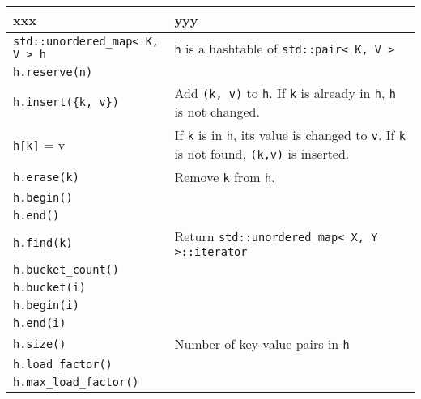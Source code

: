 {\footnotesize
\begin{tabular}{|p{}|p{}|}
  \hline
  xxx  & yyy
  \\
  \hline \hline
  \texttt{std::unordered\_map< K, V > h} & \texttt{h} is a hashtable of \texttt{std::pair< K, V >} \\ \hline 
  \texttt{h.reserve(n)}                &                                                           \\ \hline 
  \texttt{h.insert(\{k, v\})}          & Add \texttt{(k, v)} to \texttt{h}. If \verb!k! is already in \verb!h!, \verb!h! is not changed. \\ \hline
  \texttt{h[k]} = v                    & If \verb!k! is in \verb!h!, its value is changed to \verb!v!. If \verb!k! is not found, \verb!(k,v)! is inserted. \\ \hline
  \texttt{h.erase(k)}                  & Remove \verb!k! from \verb!h!.                            \\ \hline
  \texttt{h.begin()}                   &                                                           \\ \hline
  \texttt{h.end()}                     &                                                           \\ \hline
  \texttt{h.find(k)}                   & Return \texttt{std::unordered\_map< X, Y >::iterator} \\ \hline
  \texttt{h.bucket\_count()}           &                                                           \\ \hline
  \texttt{h.bucket(i)}                 &                                                           \\ \hline
  \texttt{h.begin(i)}                  &                                                           \\ \hline

  \texttt{h.end(i)}                    &                                                           \\ \hline
  \texttt{h.size()}                    & Number of key-value pairs in \verb!h!                     \\ \hline
  \texttt{h.load\_factor()}            &                                                           \\ \hline
  \texttt{h.max\_load\_factor()}       &                                                           \\ \hline
\end{tabular}
}

